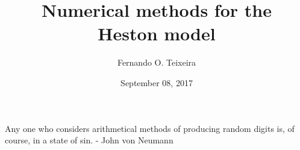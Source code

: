 \documentclass[12pt,twoside]{reedthesis}
\title{\textbf{\Huge{Numerical methods for the \\[20pt] Heston model}}}
\author{Fernando O. Teixeira}
\date{September 08, 2017}
\theoremstyle{definition}
\theoremstyle{definition}
\theoremstyle{remark}
\begin{document}
      \maketitle
  
  \frontmatter %
  \pagestyle{empty} %
      \begin{acknowledgements}
      Any one who considers arithmetical methods of producing random digits
      is, of course, in a state of sin. - John von Neumann
      \textbf{\\ \\ \\ \\ \\ \\ \\ \\ \\ \\ \\ \\ \\ \\ \\ \\ \\ \\ \\ \\ \\ \\ \\ \\ \\ \\ \\ \\ \\ \\ \\ \\ \\ \\ \\ \\ \\ \\ \\ \\ \\ \\ \\ \\ \\ \\ \\ \\ \\ \\ \\ \\ \\ \\ \\ \\ \\ \\ \\ \\ \\ \\ \\ }

\end{acknowledgements}
\end{document}
